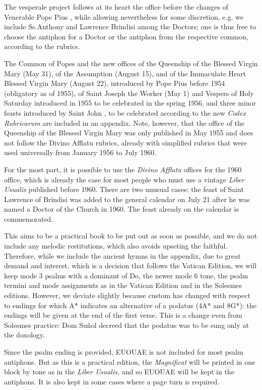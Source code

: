 \begin{enpars}
The vesperale project follows at its heart the office before the changes of Venerable Pope Pius , while allowing nevertheless for some discretion, e.g. we include Ss.\@ Anthony and Lawrence Brindisi among the Doctors; one is thus free to choose the antiphon for a Doctor or the antiphon from the respective common, according to the rubrics.

The Common of Popes and the new offices of the Queenship of the Blessed Virgin Mary (May 31), of the Assumption (August 15), and of the Immaculate Heart Blessed Virgin Mary (August 22), introduced by Pope Pius  before 1954 (obligatory as of 1955), of Saint Joseph the Worker (May 1) and Vespers of Holy Saturday introduced in 1955 to be celebrated in the spring 1956, and three minor feasts introduced by Saint John , to be celebrated according to the new \textit{Codex Rubricarum} are included in an appendix. Note, however, that the office of the Queenship of the Blessed Virgin Mary was only published in May 1955 and does not follow the Divino Afflatu rubrics, already with simplified rubrics that were used universally from January 1956 to July 1960.

For the most part, it is possible to use the \textit{Divino Afflatu} offices for the 1960 office, which is already the case for most people who must use a vintage \textit{Liber Usualis} published before 1960. There are two unusual cases: the feast of Saint Lawrence of Brindisi was added to the general calendar on July 21 after he was named a Doctor of the Church in 1960. The feast already on the calendar is commemorated.

This aims to be a practical book to be put out as soon as possible, and we do not include any melodic restitutions, which also avoids upseting the faithful. Therefore, while we include the ancient hymns in the appendix, due to great demand and interest, which is a decision that follows the Vatican Edition, we will keep mode 3 psalms with a dominant of Do, the newer mode 6 tone, the psalm termini and mode assignments as in the Vatican Edition and in the Solesmes editions. However, we deviate slightly because custom has changed with respect to endings for which A* indicates an alternative of a podatus (4A* and 8G*): the endings will be given at the end of the first verse. This is a change even from Solesmes practice: Dom Suñol decreed that the podatus was to be sung only at the doxology.

Since the psalm ending is provided, EUOUAE is not included for most psalm antiphons. But as this is a practical edition, the \textit{Magnificat} will be printed in one block by tone as in the \textit{Liber Usualis,} and so EUOUAE will be kept in the antiphons. It is also kept in some cases where a page turn is required.


\end{enpars}

